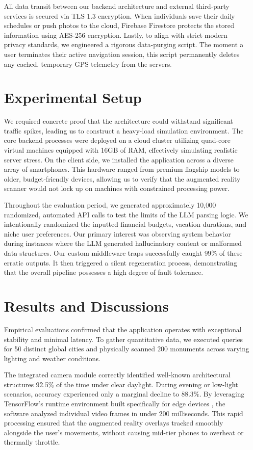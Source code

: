 \documentclass[conference]{IEEEtran}
\begin{document}
All data transit between our backend architecture and external third-party services is secured via TLS 1.3 encryption. When individuals save their daily schedules or push photos to the cloud, Firebase Firestore protects the stored information using AES-256 encryption. Lastly, to align with strict modern privacy standards, we engineered a rigorous data-purging script. The moment a user terminates their active navigation session, this script permanently deletes any cached, temporary GPS telemetry from the servers.

\section{Experimental Setup}
We required concrete proof that the architecture could withstand significant traffic spikes, leading us to construct a heavy-load simulation environment. The core backend processes were deployed on a cloud cluster utilizing quad-core virtual machines equipped with 16GB of RAM, effectively simulating realistic server stress. On the client side, we installed the application across a diverse array of smartphones. This hardware ranged from premium flagship models to older, budget-friendly devices, allowing us to verify that the augmented reality scanner would not lock up on machines with constrained processing power. 

Throughout the evaluation period, we generated approximately 10,000 randomized, automated API calls to test the limits of the LLM parsing logic. We intentionally randomized the inputted financial budgets, vacation durations, and niche user preferences. Our primary interest was observing system behavior during instances where the LLM generated hallucinatory content or malformed data structures. Our custom middleware traps successfully caught 99\% of these erratic outputs. It then triggered a silent regeneration process, demonstrating that the overall pipeline possesses a high degree of fault tolerance.

\section{Results and Discussions}
Empirical evaluations confirmed that the application operates with exceptional stability and minimal latency. To gather quantitative data, we executed queries for 50 distinct global cities and physically scanned 200 monuments across varying lighting and weather conditions. 

The integrated camera module correctly identified well-known architectural structures 92.5\% of the time under clear daylight. During evening or low-light scenarios, accuracy experienced only a marginal decline to 88.3\%. By leveraging TensorFlow's runtime environment built specifically for edge devices \cite{b8}, the software analyzed individual video frames in under 200 milliseconds. This rapid processing ensured that the augmented reality overlays tracked smoothly alongside the user's movements, without causing mid-tier phones to overheat or thermally throttle.
\end{document}
